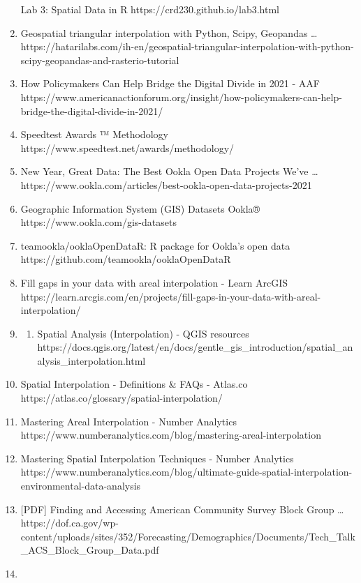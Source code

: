 \documentclass[
  letterpaper,
  DIV=11,
  numbers=noendperiod]{scrartcl}
\providecommand{\tightlist}{%
  \setlength{\itemsep}{0pt}\setlength{\parskip}{0pt}}
\begin{document}
\begin{enumerate}
  Lab 3: Spatial Data in R https://crd230.github.io/lab3.html
\item
  Geospatial triangular interpolation with Python, Scipy, Geopandas
  \ldots{}
  https://hatarilabs.com/ih-en/geospatial-triangular-interpolation-with-python-scipy-geopandas-and-rasterio-tutorial
\item
  How Policymakers Can Help Bridge the Digital Divide in 2021 - AAF
  https://www.americanactionforum.org/insight/how-policymakers-can-help-bridge-the-digital-divide-in-2021/
\item
  Speedtest Awards ™ Methodology
  https://www.speedtest.net/awards/methodology/
\item
  New Year, Great Data: The Best Ookla Open Data Projects We've \ldots{}
  https://www.ookla.com/articles/best-ookla-open-data-projects-2021
\item
  Geographic Information System (GIS) Datasets \textbar{} Ookla®
  https://www.ookla.com/gis-datasets
\item
  teamookla/ooklaOpenDataR: R package for Ookla's open data
  https://github.com/teamookla/ooklaOpenDataR
\item
  Fill gaps in your data with areal interpolation - Learn ArcGIS
  https://learn.arcgis.com/en/projects/fill-gaps-in-your-data-with-areal-interpolation/
\item
  \begin{enumerate}
  \def\labelenumii{\arabic{enumii}.}
  \setcounter{enumii}{10}
  \tightlist
  \item
    Spatial Analysis (Interpolation) - QGIS resources
    https://docs.qgis.org/latest/en/docs/gentle\_gis\_introduction/spatial\_analysis\_interpolation.html
  \end{enumerate}
\item
  Spatial Interpolation - Definitions \& FAQs - Atlas.co
  https://atlas.co/glossary/spatial-interpolation/
\item
  Mastering Areal Interpolation - Number Analytics
  https://www.numberanalytics.com/blog/mastering-areal-interpolation
\item
  Mastering Spatial Interpolation Techniques - Number Analytics
  https://www.numberanalytics.com/blog/ultimate-guide-spatial-interpolation-environmental-data-analysis
\item
  {[}PDF{]} Finding and Accessing American Community Survey Block Group
  \ldots{}
  https://dof.ca.gov/wp-content/uploads/sites/352/Forecasting/Demographics/Documents/Tech\_Talk\_ACS\_Block\_Group\_Data.pdf
\item

\end{enumerate}
\end{document}
